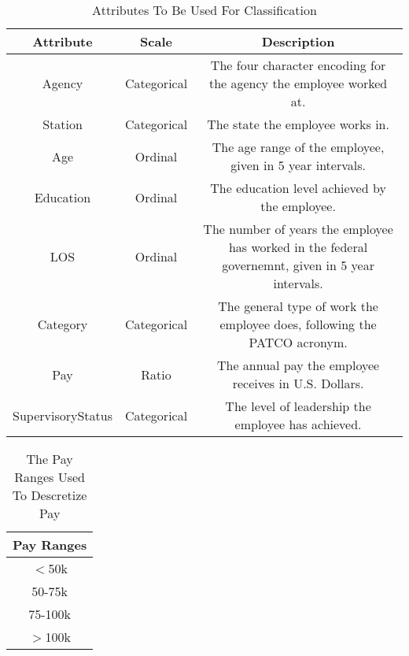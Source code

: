 \documentclass{article}
\begin{document}
    \begin{center}
        \begin{table}
            \centering
            \begin{tabular}{ |c|c|c| }
                \hline
                Attribute & Scale & Description \\
                \hline
                Agency & Categorical & The four character encoding for the agency the employee worked at. \\
                Station & Categorical & The state the employee works in. \\
                Age & Ordinal & The age range of the employee, given in 5 year intervals. \\
                Education & Ordinal & The education level achieved by the employee. \\
                LOS & Ordinal & The number of years the employee has worked in the federal governemnt, given in 5 year intervals. \\
                Category & Categorical & The general type of work the employee does, following the PATCO acronym. \\
                Pay & Ratio & The annual pay the employee receives in U.S. Dollars. \\
                SupervisoryStatus & Categorical & The level of leadership the employee has achieved. \\
                \hline
            \end{tabular}
            \caption{Attributes To Be Used For Classification}
            \label{tab:1}
        \end{table}
    \end{center}

    \begin{center}
        \begin{table}
            \centering
            \begin{tabular}{ |c| }
                \hline
                Pay Ranges \\
                \hline
                $<$50k \\
                50-75k \\
                75-100k \\
                $>$100k \\
                \hline
            \end{tabular}
            \caption{The Pay Ranges Used To Descretize Pay}
            \label{tab:2}
        \end{table}
    \end{center}
\end{document}
